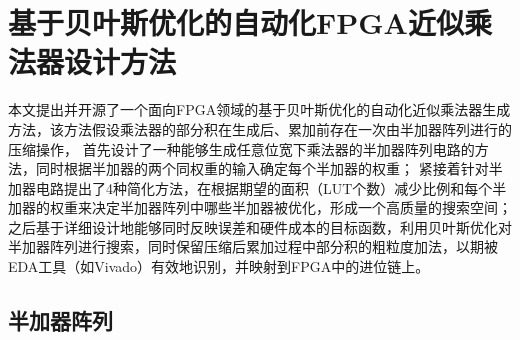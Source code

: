 \section{基于贝叶斯优化的自动化FPGA近似乘法器设计方法}

本文提出并开源了一个面向FPGA领域的基于贝叶斯优化的自动化近似乘法器生成方法，该方法假设乘法器的部分积在生成后、累加前存在一次由半加器阵列进行的压缩操作，
首先设计了一种能够生成任意位宽下乘法器的半加器阵列电路的方法，同时根据半加器的两个同权重的输入确定每个半加器的权重；
紧接着针对半加器电路提出了4种简化方法，在根据期望的面积（LUT个数）减少比例和每个半加器的权重来决定半加器阵列中哪些半加器被优化，形成一个高质量的搜索空间；
之后基于详细设计地能够同时反映误差和硬件成本的目标函数，利用贝叶斯优化对半加器阵列进行搜索，同时保留压缩后累加过程中部分积的粗粒度加法，以期被EDA工具（如Vivado）有效地识别，并映射到FPGA中的进位链上。

\subsection{半加器阵列}

